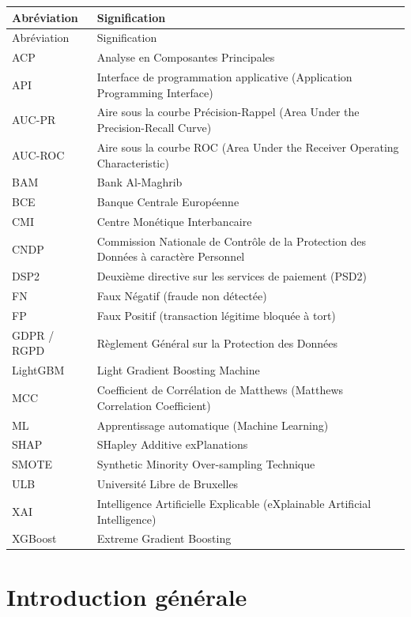 \begin{longtable}{|p{}|p{}|}
\hline
Abréviation & Signification \\
\hline
\endfirsthead
\hline
Abréviation & Signification \\
\hline
\endhead
ACP & Analyse en Composantes Principales \\
\hline
API & Interface de programmation applicative (Application Programming Interface) \\
\hline
AUC-PR & Aire sous la courbe Précision-Rappel (Area Under the Precision-Recall Curve) \\
\hline
AUC-ROC & Aire sous la courbe ROC (Area Under the Receiver Operating Characteristic) \\
\hline
BAM & Bank Al-Maghrib \\
\hline
BCE & Banque Centrale Européenne \\
\hline
CMI & Centre Monétique Interbancaire \\
\hline
CNDP & Commission Nationale de Contrôle de la Protection des Données à caractère Personnel \\
\hline
DSP2 & Deuxième directive sur les services de paiement (PSD2) \\
\hline
FN & Faux Négatif (fraude non détectée) \\
\hline
FP & Faux Positif (transaction légitime bloquée à tort) \\
\hline
GDPR / RGPD & Règlement Général sur la Protection des Données \\
\hline
LightGBM & Light Gradient Boosting Machine \\
\hline
MCC & Coefficient de Corrélation de Matthews (Matthews Correlation Coefficient) \\
\hline
ML & Apprentissage automatique (Machine Learning) \\
\hline
SHAP & SHapley Additive exPlanations \\
\hline
SMOTE & Synthetic Minority Over-sampling Technique \\
\hline
ULB & Université Libre de Bruxelles \\
\hline
XAI & Intelligence Artificielle Explicable (eXplainable Artificial Intelligence) \\
\hline
XGBoost & Extreme Gradient Boosting \\
\hline
\end{longtable}

\chapter*{Introduction générale}

